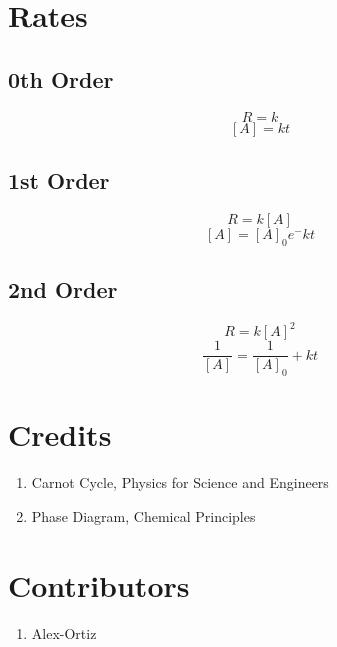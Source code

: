 \documentclass{article}
\begin{document}
\section{Rates}
\subsection{0th Order}
\[
R = k
\]
\[
[A] = kt
\]
\subsection{1st Order}
\[
R = k[A]
\]
\[
[A] = [A]_0 e^-kt
\]
\subsection{2nd Order}
\[
R = k [A]^2
\]
\[
\frac{1}{[A]} = \frac{1}{[A]_0} +kt
\]


\section{Credits}
\begin{enumerate}
\item Carnot Cycle, Physics for Science and Engineers
\item Phase Diagram, Chemical Principles
\end{enumerate}

\section{Contributors}
\begin{enumerate}
\item Alex-Ortiz

\end{enumerate}
\end{document}
